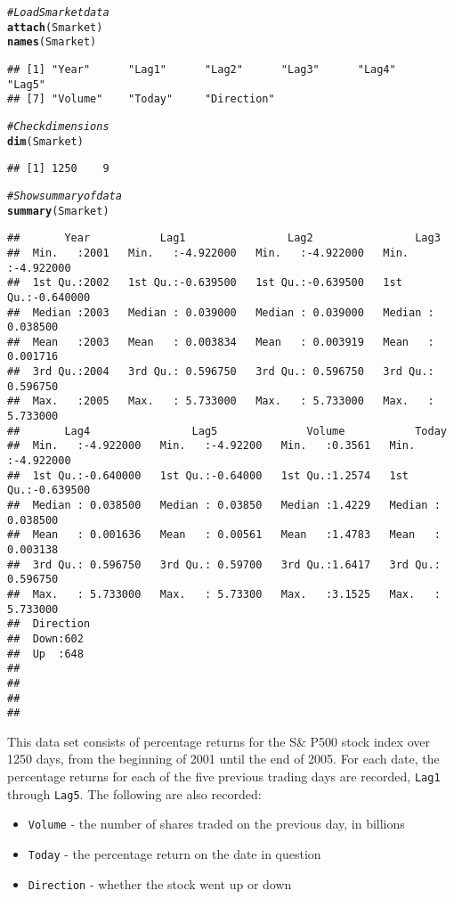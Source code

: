 \documentclass[12pt]{article}\usepackage[]{graphicx}\usepackage[]{color}
\makeatletter
\newcommand{\hlcom}[1]{\textcolor[rgb]{0.678,0.584,0.686}{\textit{#1}}}%
\newcommand{\hlstd}[1]{\textcolor[rgb]{0.345,0.345,0.345}{#1}}%
\newcommand{\hlkwd}[1]{\textcolor[rgb]{0.737,0.353,0.396}{\textbf{#1}}}%
\newenvironment{kframe}{%
 \def\at@end@of@kframe{}%
 \ifinner\ifhmode%
  \def\at@end@of@kframe{\end{minipage}}%
  \begin{minipage}{\columnwidth}%
 \fi\fi%
 \def\FrameCommand##1{\hskip\@totalleftmargin \hskip-\fboxsep
 \colorbox{shadecolor}{##1}\hskip-\fboxsep
     \hskip-\linewidth \hskip-\@totalleftmargin \hskip\columnwidth}%
 \MakeFramed {\advance\hsize-\width
   \@totalleftmargin\z@ \linewidth\hsize
   \@setminipage}}%
 {\par\unskip\endMakeFramed%
 \at@end@of@kframe}
\newenvironment{knitrout}{}{} %
\makeatother
\begin{document}
\begin{knitrout}
\color{fgcolor}\begin{kframe}
\begin{alltt}
\hlcom{#Load Smarket data}
\hlkwd{attach}\hlstd{(Smarket)}
\hlkwd{names}\hlstd{(Smarket)}
\end{alltt}
\begin{verbatim}
## [1] "Year"      "Lag1"      "Lag2"      "Lag3"      "Lag4"      "Lag5"     
## [7] "Volume"    "Today"     "Direction"
\end{verbatim}
\begin{alltt}
\hlcom{#Check dimensions}
\hlkwd{dim}\hlstd{(Smarket)}
\end{alltt}
\begin{verbatim}
## [1] 1250    9
\end{verbatim}
\begin{alltt}
\hlcom{#Show summary of data}
\hlkwd{summary}\hlstd{(Smarket)}
\end{alltt}
\begin{verbatim}
##       Year           Lag1                Lag2                Lag3          
##  Min.   :2001   Min.   :-4.922000   Min.   :-4.922000   Min.   :-4.922000  
##  1st Qu.:2002   1st Qu.:-0.639500   1st Qu.:-0.639500   1st Qu.:-0.640000  
##  Median :2003   Median : 0.039000   Median : 0.039000   Median : 0.038500  
##  Mean   :2003   Mean   : 0.003834   Mean   : 0.003919   Mean   : 0.001716  
##  3rd Qu.:2004   3rd Qu.: 0.596750   3rd Qu.: 0.596750   3rd Qu.: 0.596750  
##  Max.   :2005   Max.   : 5.733000   Max.   : 5.733000   Max.   : 5.733000  
##       Lag4                Lag5              Volume           Today          
##  Min.   :-4.922000   Min.   :-4.92200   Min.   :0.3561   Min.   :-4.922000  
##  1st Qu.:-0.640000   1st Qu.:-0.64000   1st Qu.:1.2574   1st Qu.:-0.639500  
##  Median : 0.038500   Median : 0.03850   Median :1.4229   Median : 0.038500  
##  Mean   : 0.001636   Mean   : 0.00561   Mean   :1.4783   Mean   : 0.003138  
##  3rd Qu.: 0.596750   3rd Qu.: 0.59700   3rd Qu.:1.6417   3rd Qu.: 0.596750  
##  Max.   : 5.733000   Max.   : 5.73300   Max.   :3.1525   Max.   : 5.733000  
##  Direction 
##  Down:602  
##  Up  :648  
##            
##            
##            
## 
\end{verbatim}
\end{kframe}
\end{knitrout}

This data set consists of percentage returns for the S\& P500 stock index over 1250 days, from the beginning of 2001 until the end of 2005. For each date, the percentage returns for each of the five previous trading days are recorded, \texttt{Lag1} through \texttt{Lag5}. The following are also recorded:
\begin{itemize}
\item \texttt{Volume} - the number of shares traded on the previous day, in billions
\item \texttt{Today} - the percentage return on the date in question
\item \texttt{Direction} - whether the stock went up or down
\end{itemize}
\end{document}
